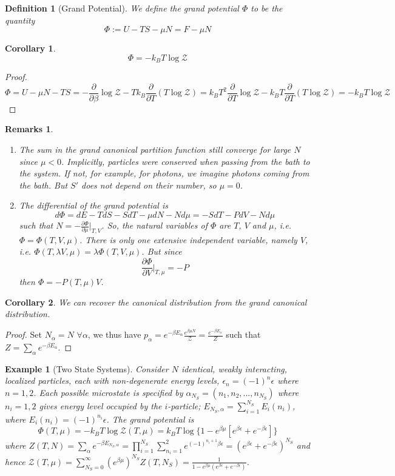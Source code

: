 \documentclass[a4paper]{article}
\newtheorem{eg}{Example}[section]
\newtheorem{remarks}{Remarks}[section]
\theoremstyle{new}
\newtheorem{defi}{Definition}[section]
\newtheorem{cor}{Corollary}[section]
\begin{document}
\begin{defi}[Grand Potential]
We define the grand potential $\Phi$ to be the quantity
$$\Phi:=U-TS-\mu N=F-\mu N$$
\end{defi}
\begin{cor}
$$\Phi=-k_BT\log\mathcal{Z}$$
\end{cor}
\begin{proof}
$$\Phi=U-\mu N-TS=-\frac{\partial}{\partial\beta}\log\mathcal{Z}-Tk_B\frac{\partial}{\partial T}(T\log\mathcal{Z})=k_BT^2\frac{\partial}{\partial T}\log\mathcal{Z}-k_BT\frac{\partial}{\partial T}(T\log\mathcal{Z})=-k_BT\log\mathcal{Z}$$
\end{proof}
\begin{remarks}\leavevmode
\begin{enumerate}
\item The sum in the grand canonical partition function still converge for large $N$ since $\mu<0$. Implicitly, particles were conserved when passing from the bath to the system. If not, for example, for photons, we imagine photons coming from the bath. But $S'$ does not depend on their number, so $\mu=0$. 
\item The differential of the grand potential is
$$d\Phi=dE-TdS-SdT-\mu dN-Nd\mu=-SdT-PdV-Nd\mu$$
such that $N=-\frac{\partial\Phi}{\partial\mu}|_{T,V}$. So, the natural variables of $\Phi$ are $T$, $V$ and $\mu$, i.e. $\Phi=\Phi(T,V,\mu)$. There is only one extensive independent variable, namely $V$, i.e. $\Phi(T,\lambda V,\mu)=\lambda\Phi(T,V,\mu)$. But since 
$$\frac{\partial\Phi}{\partial V}\bigg|_{T,\mu}=-P$$
then $\Phi=-P(T,\mu)V$.
\end{enumerate}
\end{remarks}
\begin{cor}
We can recover the canonical distribution from the grand canonical distribution.
\end{cor}
\begin{proof}
Set $N_\alpha=N$ $\forall\alpha$, we thus have $p_\alpha=e^{-\beta E_\alpha}\frac{e^{\beta\mu N}}{\mathcal{Z}}=\frac{e^{-\beta E_\alpha}}{Z}$ such that $Z=\sum_\alpha e^{-\beta E_\alpha}$.
\end{proof}
\begin{eg}[Two State Systems]
Consider $N$ identical, weakly interacting, localized particles, each with non-degenerate energy levels, $\epsilon_n=(-1)^n\epsilon$ where $n=1,2$. Each possible microstate is specified by $\alpha_{N_S}=(n_1,n_2,...,n_{N_S})$ where $n_i=1,2$ gives energy level occupied by the $i$-particle; $E_{N_S,\alpha}=\sum_{i=1}^{N_S}E_i(n_i)$, where $E_i(n_i)=(-1)^{n_i}\epsilon$. The grand potential is
$$\Phi(T,\mu)=-k_BT\log\mathcal{Z}(T,\mu)=k_BT\log\{1-e^{\beta\mu}[e^{\beta\epsilon}+e^{-\beta\epsilon}]\}$$
where $Z(T,N)=\sum_\alpha e^{-\beta E_{N_S,\alpha}}=\prod_{i=1}^{N_S}\sum_{n_i=1}^2e^{(-1)^{n_i+1}\beta\epsilon}=(e^{\beta\epsilon}+e^{-\beta\epsilon})^{N_S}$ and hence $\mathcal{Z}(T,\mu)=\sum_{N_S=0}^\infty (e^{\beta\mu})^{N_S}Z(T,N_S)=\frac{1}{1-e^{\beta\mu}(e^{\beta\epsilon}+e^{-\beta\epsilon})}$.
\end{eg}
\end{document}
